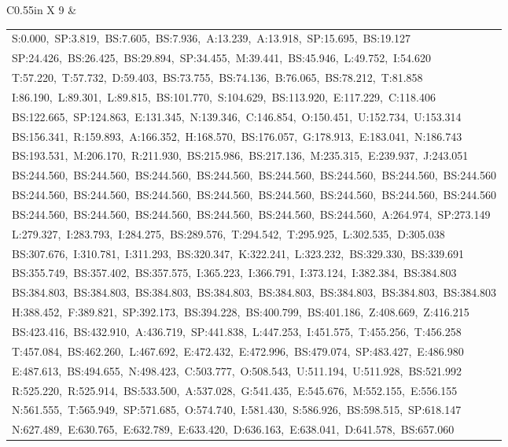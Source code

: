 \documentclass[10pt,a4paper]{article}
\begin{document}
\begin{center}
\begin{tabularx}{\textwidth}{
    C{0.55in}
    X
}
9 &
\begin{tabular}[t]{@{}l@{}}
S:0.000,\ SP:3.819,\ BS:7.605,\ BS:7.936,\ A:13.239,\ A:13.918,\ SP:15.695,\ BS:19.127\\
SP:24.426,\ BS:26.425,\ BS:29.894,\ SP:34.455,\ M:39.441,\ BS:45.946,\ L:49.752,\ I:54.620\\
T:57.220,\ T:57.732,\ D:59.403,\ BS:73.755,\ BS:74.136,\ B:76.065,\ BS:78.212,\ T:81.858\\
I:86.190,\ L:89.301,\ L:89.815,\ BS:101.770,\ S:104.629,\ BS:113.920,\ E:117.229,\ C:118.406\\
BS:122.665,\ SP:124.863,\ E:131.345,\ N:139.346,\ C:146.854,\ O:150.451,\ U:152.734,\ U:153.314\\
BS:156.341,\ R:159.893,\ A:166.352,\ H:168.570,\ BS:176.057,\ G:178.913,\ E:183.041,\ N:186.743\\
BS:193.531,\ M:206.170,\ R:211.930,\ BS:215.986,\ BS:217.136,\ M:235.315,\ E:239.937,\ J:243.051\\
BS:244.560,\ BS:244.560,\ BS:244.560,\ BS:244.560,\ BS:244.560,\ BS:244.560,\ BS:244.560,\ BS:244.560\\
BS:244.560,\ BS:244.560,\ BS:244.560,\ BS:244.560,\ BS:244.560,\ BS:244.560,\ BS:244.560,\ BS:244.560\\
BS:244.560,\ BS:244.560,\ BS:244.560,\ BS:244.560,\ BS:244.560,\ BS:244.560,\ A:264.974,\ SP:273.149\\
L:279.327,\ I:283.793,\ I:284.275,\ BS:289.576,\ T:294.542,\ T:295.925,\ L:302.535,\ D:305.038\\
BS:307.676,\ I:310.781,\ I:311.293,\ BS:320.347,\ K:322.241,\ L:323.232,\ BS:329.330,\ BS:339.691\\
BS:355.749,\ BS:357.402,\ BS:357.575,\ I:365.223,\ I:366.791,\ I:373.124,\ I:382.384,\ BS:384.803\\
BS:384.803,\ BS:384.803,\ BS:384.803,\ BS:384.803,\ BS:384.803,\ BS:384.803,\ BS:384.803,\ BS:384.803\\
H:388.452,\ F:389.821,\ SP:392.173,\ BS:394.228,\ BS:400.799,\ BS:401.186,\ Z:408.669,\ Z:416.215\\
BS:423.416,\ BS:432.910,\ A:436.719,\ SP:441.838,\ L:447.253,\ I:451.575,\ T:455.256,\ T:456.258\\
T:457.084,\ BS:462.260,\ L:467.692,\ E:472.432,\ E:472.996,\ BS:479.074,\ SP:483.427,\ E:486.980\\
E:487.613,\ BS:494.655,\ N:498.423,\ C:503.777,\ O:508.543,\ U:511.194,\ U:511.928,\ BS:521.992\\
R:525.220,\ R:525.914,\ BS:533.500,\ A:537.028,\ G:541.435,\ E:545.676,\ M:552.155,\ E:556.155\\
N:561.555,\ T:565.949,\ SP:571.685,\ O:574.740,\ I:581.430,\ S:586.926,\ BS:598.515,\ SP:618.147\\
N:627.489,\ E:630.765,\ E:632.789,\ E:633.420,\ D:636.163,\ E:638.041,\ D:641.578,\ BS:657.060
\end{tabular}
\\[0.12cm]


\end{tabularx}
\end{center}
\end{document}
